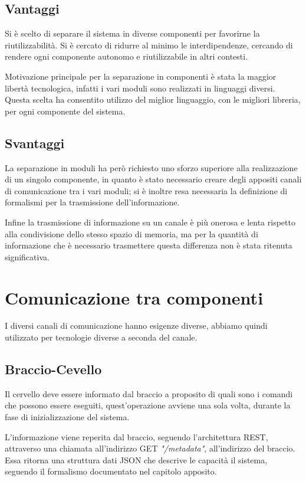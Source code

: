 \documentclass[twoside]{supsistudent}
\begin{document}
\section{Vantaggi}
Si è scelto di separare il sistema in diverse componenti per favorirne la riutilizzabilità. Si è cercato di ridurre al minimo le interdipendenze, cercando di rendere ogni componente autonomo e riutilizzabile in altri contesti.

Motivazione principale per la separazione in componenti è stata la maggior libertà tecnologica, infatti i vari moduli sono realizzati in linguaggi diversi. 
Questa scelta ha consentito utilizzo del miglior linguaggio, con le migliori libreria, per ogni componente del sistema.

\section{Svantaggi}

La separazione in moduli ha però richiesto uno sforzo superiore alla realizzazione di un singolo componente, in quanto è stato necessario creare degli appositi canali di comunicazione tra i vari moduli; si è inoltre resa necessaria la definizione di formalismi per la trasmissione dell'informazione.

Infine la trasmissione di informazione su un canale è più onerosa e lenta rispetto alla condivisione dello stesso spazio di memoria, ma per la quantità di informazione che è necessario trasmettere questa differenza non è stata ritenuta significativa.

\chapter{Comunicazione tra componenti}
I diversi canali di comunicazione hanno esigenze diverse, abbiamo quindi utilizzato per tecnologie diverse a seconda del canale.
\section{Braccio-Cevello}
Il cervello deve essere informato dal braccio a proposito di quali sono i comandi che possono essere eseguiti, quest'operazione avviene una sola volta, durante la fase di inizializzazione del sistema.

L'informazione viene reperita dal braccio, seguendo l'architettura REST, attraverso una chiamata all'indirizzo GET \textit{"/metadata"}, all'indirizzo del braccio. Essa ritorna una struttura dati JSON che descrive le capacità il sistema, seguendo il formalismo documentato nel capitolo apposito.
\end{document}
